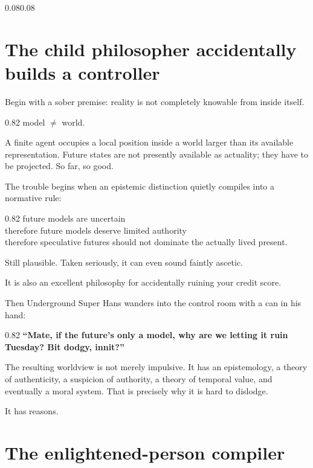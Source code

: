 \documentclass[10pt,letterpaper]{article}
\newenvironment{paperbody}
  {\begin{adjustwidth}{0.08\textwidth}{0.08\textwidth}\justifying}
  {\par\end{adjustwidth}}
\newenvironment{voicebox}
  {\Needspace{3.5\baselineskip}\par\vspace{0.22em}\begin{center}\begingroup
   \begin{lrbox}{\voiceboxsave}\begin{varwidth}{0.82\linewidth}
   \small\rmfamily\upshape\RaggedRight}
  {\end{varwidth}\end{lrbox}\fbox{\usebox{\voiceboxsave}}
   \endgroup\end{center}\vspace{0.22em}}
\let\oldsection\section
\renewcommand{\section}{\Needspace{6\baselineskip}\oldsection}
\begin{document}
\begin{paperbody}
\section{The child philosopher accidentally builds a
controller}\label{the-child-philosopher-accidentally-builds-a-controller}

Begin with a sober premise: reality is not completely knowable from
inside itself.

\begin{voicebox}
model $\neq$ world.
\end{voicebox}

A finite agent occupies a local position inside a world larger than its
available representation. Future states are not presently available as
actuality; they have to be projected. So far, so good.

The trouble begins when an epistemic distinction quietly compiles into a
normative rule:

\begin{voicebox}
future models are uncertain\\
therefore future models deserve limited authority\\
therefore speculative futures should not dominate the actually lived
present.
\end{voicebox}

Still plausible. Taken seriously, it can even sound faintly ascetic.

It is also an excellent philosophy for accidentally ruining your credit
score.

Then Underground Super Hans wanders into the control room with a can in
his hand:

\begin{voicebox}
\textbf{``Mate, if the future's only a model, why are we letting it ruin
Tuesday? Bit dodgy, innit?''}
\end{voicebox}

The resulting worldview is not merely impulsive. It has an epistemology,
a theory of authenticity, a suspicion of authority, a theory of temporal
value, and eventually a moral system. That is precisely why it is hard
to dislodge.

It has reasons.

\section{The enlightened-person
compiler}\label{the-enlightened-person-compiler}


\end{paperbody}
\end{document}
